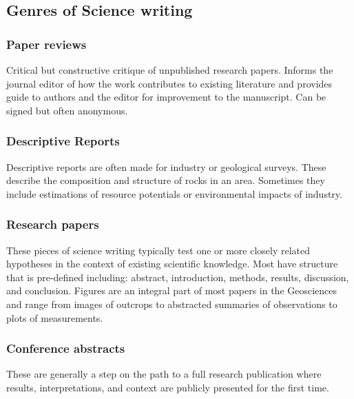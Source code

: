 \documentclass[11pt,]{article}
\begin{document}
\hypertarget{genres-of-science-writing}{%
\subsection{Genres of Science writing}\label{genres-of-science-writing}}

\hypertarget{paper-reviews}{%
\subsubsection{Paper reviews}\label{paper-reviews}}

Critical but constructive critique of unpublished research papers.
Informs the journal editor of how the work contributes to existing
literature and provides guide to authors and the editor for improvement
to the manuscript. Can be signed but often anonymous.

\hypertarget{descriptive-reports}{%
\subsubsection{Descriptive Reports}\label{descriptive-reports}}

Descriptive reports are often made for industry or geological surveys.
These describe the composition and structure of rocks in an area.
Sometimes they include estimations of resource potentials or
environmental impacts of industry.

\hypertarget{research-papers}{%
\subsubsection{Research papers}\label{research-papers}}

These pieces of science writing typically test one or more closely
related hypotheses in the context of existing scientific knowledge. Most
have structure that is pre-defined including: abstract, introduction,
methods, results, discussion, and conclusion. Figures are an integral
part of most papers in the Geosciences and range from images of outcrops
to abstracted summaries of observations to plots of measurements.

\hypertarget{conference-abstracts}{%
\subsubsection{Conference abstracts}\label{conference-abstracts}}

These are generally a step on the path to a full research publication
where results, interpretations, and context are publicly presented for
the first time.
\end{document}
